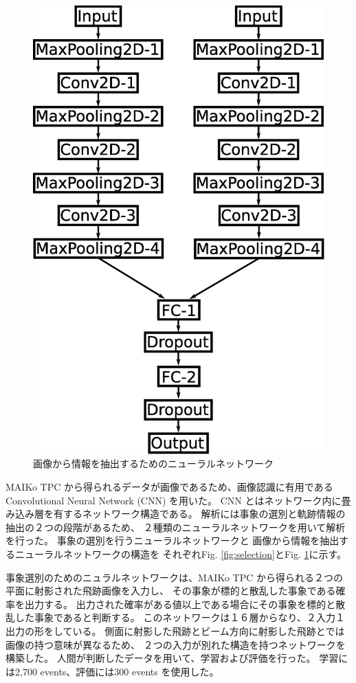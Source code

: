 \documentclass{jps-cp}
\begin{document}
\begin{figure}
\begin{minipage}{0.4\columnwidth}
    \includegraphics[clip, width=0.9\columnwidth]{eps/point_detection.eps}
    \caption{画像から情報を抽出するためのニューラルネットワーク}
    \label{fig:extraction}
  \end{minipage}
\end{figure}

MAIKo TPC から得られるデータが画像であるため、画像認識に有用であるConvolutional Neural Network (CNN) を用いた。
CNN とはネットワーク内に畳み込み層を有するネットワーク構造である。
解析には事象の選別と軌跡情報の抽出の２つの段階があるため、
２種類のニューラルネットワークを用いて解析を行った。
事象の選別を行うニューラルネットワークと
画像から情報を抽出するニューラルネットワークの構造を
それぞれFig. \ref{fig:selection}とFig. \ref{fig:extraction}に示す。

事象選別のためのニュラルネットワークは、MAIKo TPC から得られる２つの平面に射影された飛跡画像を入力し、
その事象が標的と散乱した事象である確率を出力する。
出力された確率がある値以上である場合にその事象を標的と散乱した事象であると判断する。
このネットワークは１６層からなり、２入力１出力の形をしている。
側面に射影した飛跡とビーム方向に射影した飛跡とでは画像の持つ意味が異なるため、
２つの入力が別れた構造を持つネットワークを構築した。
人間が判断したデータを用いて、学習および評価を行った。
学習には2,700 events、評価には300 events を使用した。
\end{document}
